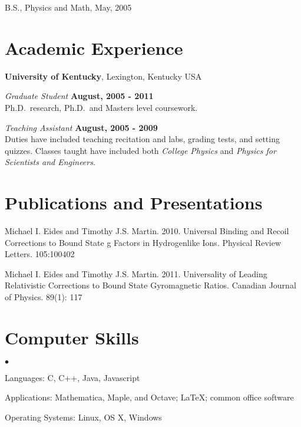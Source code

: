 \documentclass[margin,line]{res}
\newenvironment{list1}{
  \begin{list}{\ding{113}}{%
      \setlength{\itemsep}{0in}
      \setlength{\parsep}{0in} \setlength{\parskip}{0in}
      \setlength{\topsep}{0in} \setlength{\partopsep}{0in} 
      \setlength{\leftmargin}{0.17in}}}{\end{list}}
\newenvironment{list2}{
  \begin{list}{$\bullet$}{%
      \setlength{\itemsep}{0in}
      \setlength{\parsep}{0in} \setlength{\parskip}{0in}
      \setlength{\topsep}{0in} \setlength{\partopsep}{0in} 
      \setlength{\leftmargin}{0.2in}}}{\end{list}}
\begin{document}
\begin{resume}
\begin{list1}
\item[] B.S., Physics and Math,  May, 2005
\end{list1}







%

\section{\sc Academic Experience}
{\bf University of Kentucky}, Lexington, Kentucky USA

\vspace{-.3cm}
{\em Graduate Student} \hfill {\bf August, 2005 - 2011}\\
Ph.D.~research, Ph.D.~and Masters level coursework.

{\em Teaching Assistant} \hfill {\bf August, 2005  - 2009}\\
Duties have included teaching recitation and labs, grading tests, and setting quizzes.  Classes taught have included both {\it{College Physics}} and {\it{Physics for Scientists and Engineers}}.



\section{\sc Publications and Presentations}
Michael I. Eides and Timothy J.S. Martin.  2010.  Universal Binding and Recoil Corrections to Bound State g Factors in Hydrogenlike Ions.  Physical Review Letters.  105:100402

Michael I. Eides and Timothy J.S. Martin.  2011.  Universality of Leading Relativistic Corrections to Bound State Gyromagnetic Ratios.  Canadian Journal of Physics.  89(1): 117




\section{\sc Computer Skills} 
\begin{list2}
\item Languages:  C, C++, Java, Javascript
\item Applications: Mathematica, Maple, and Octave; \LaTeX; common office software
\item Operating Systems:  Linux, OS X, Windows\\ 
\end{list2}



\end{resume}
\end{document}
